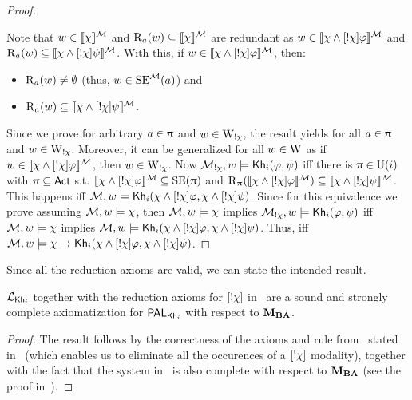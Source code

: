 \begin{proof}
\begin{itemize}
	\end{itemize}
	Note that $w \in \llbracket \chi \rrbracket^{\mathcal{M}}$ and $\operatorname{R}_a(w) \subseteq \llbracket \chi \rrbracket^{\mathcal{M}}$ are redundant as $w \in \llbracket \chi \wedge [!\chi]\varphi \rrbracket^{\mathcal{M}}$ and $\operatorname{R}_a(w) \subseteq \llbracket \chi \wedge [!\chi]\psi \rrbracket^{\mathcal{M}}$.
	With this, if $w \in \llbracket \chi \wedge [!\chi]\varphi \rrbracket^{\mathcal{M}}$, then:
	\begin{itemize}
		\item $\operatorname{R}_a(w) \neq \emptyset$ (thus, $w \in \operatorname{SE}^{\mathcal{M}}(a)$) and
		\item $\operatorname{R}_a(w) \subseteq \llbracket \chi \wedge [!\chi]\psi \rrbracket^{\mathcal{M}}$.
	\end{itemize}
	Since we prove for arbitrary $a \in \uppi$ and $w \in \operatorname{W}_{!\chi}$, the result yields for all $a \in \uppi$ and $w \in \operatorname{W}_{!\chi}$.
	Moreover, it can be generalized for all $w \in \operatorname{W}$ as if $w \in \llbracket \chi \wedge [!\chi]\varphi \rrbracket^{\mathcal{M}}$, then $w \in \operatorname{W}_{!\chi}$.
	Now $\mathcal{M}_{!\chi},w \models {\sf Kh}_i(\varphi,\psi)$ iff there is $\uppi \in \operatorname{U}(i)$ with $\uppi \subseteq {\rm \sf Act}$ s.t. $\llbracket \chi \wedge [!\chi]\varphi \rrbracket^{\mathcal{M}} \subseteq \operatorname{SE}(\uppi)$ and $\operatorname{R}_\uppi(\llbracket \chi \wedge [!\chi]\varphi \rrbracket^{\mathcal{M}}) \subseteq \llbracket \chi \wedge [!\chi]\psi \rrbracket^{\mathcal{M}}$.
	This happens iff $\mathcal{M},w \models {\sf Kh}_i(\chi \wedge [!\chi]\varphi,\chi \wedge [!\chi]\psi)$. Since for this equivalence we prove assuming $\mathcal{M},w \models \chi$, then $\mathcal{M},w \models \chi$ implies $\mathcal{M}_{!\chi},w \models {\sf Kh}_i(\varphi,\psi)$ iff $\mathcal{M},w \models \chi$ implies $\mathcal{M},w \models {\sf Kh}_i(\chi \wedge [!\chi]\varphi,\chi \wedge [!\chi]\psi)$. Thus, iff $\mathcal{M},w \models \chi \rightarrow {\sf Kh}_i(\chi \wedge [!\chi]\varphi,\chi \wedge [!\chi]\psi)$.
	\end{proof}
	
	

Since all the reduction axioms are valid, we can state the intended result. 

\medskip 

\begin{theorem}\label{th:palcomplete}
$\mathcal{L}_{{\sf Kh}_i}$ together with the reduction axioms for $[!\chi]$ in~ are a sound and strongly complete axiomatization for $\mathsf{PAL}_{{\sf Kh}_i}$ with respect to $\mathbf{M}_{\mathbf{BA}}$.
\end{theorem}

\begin{proof}
The result follows by the correctness of the axioms and rule from~ stated in~ (which enables us to eliminate all the occurences of a $[!\chi]$ modality), together with the fact that the system in~ is also complete with respect to $\mathbf{M}_{\mathbf{BA}}$ (see the proof in~\cite{AFSVQ21,AFSVQ23report}).
\end{proof}


